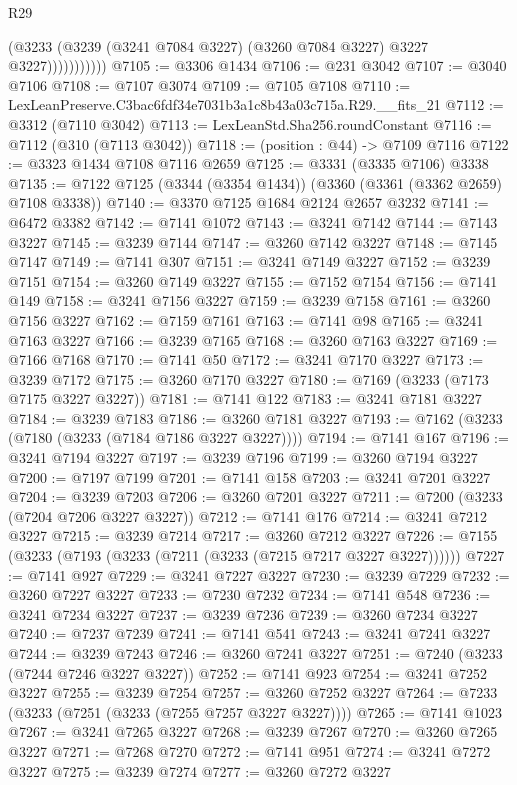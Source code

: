 \begin{lexlean}{R29}
\begin{coremodule}
                      (@3233 (@3239 (@3241 @7084 @3227) (@3260 @7084 @3227) @3227 @3227)))))))))))
@7105 := @3306 @1434
@7106 := @231 @3042
@7107 := @3040 @7106
@7108 := @7107 @3074
@7109 := @7105 @7108
@7110 := LexLeanPreserve.C3bac6fdf34e7031b3a1c8b43a03c715a.R29.__fits_21
@7112 := @3312 (@7110 @3042)
@7113 := LexLeanStd.Sha256.roundConstant
@7116 := @7112 (@310 (@7113 @3042))
@7118 := (position : @44) -> @7109 @7116
@7122 := @3323 @1434 @7108 @7116 @2659
@7125 := @3331 (@3335 @7106) @3338
@7135 := @7122 @7125 (@3344 (@3354 @1434)) (@3360 (@3361 (@3362 @2659) @7108 @3338))
@7140 := @3370 @7125 @1684 @2124 @2657 @3232
@7141 := @6472 @3382
@7142 := @7141 @1072
@7143 := @3241 @7142
@7144 := @7143 @3227
@7145 := @3239 @7144
@7147 := @3260 @7142 @3227
@7148 := @7145 @7147
@7149 := @7141 @307
@7151 := @3241 @7149 @3227
@7152 := @3239 @7151
@7154 := @3260 @7149 @3227
@7155 := @7152 @7154
@7156 := @7141 @149
@7158 := @3241 @7156 @3227
@7159 := @3239 @7158
@7161 := @3260 @7156 @3227
@7162 := @7159 @7161
@7163 := @7141 @98
@7165 := @3241 @7163 @3227
@7166 := @3239 @7165
@7168 := @3260 @7163 @3227
@7169 := @7166 @7168
@7170 := @7141 @50
@7172 := @3241 @7170 @3227
@7173 := @3239 @7172
@7175 := @3260 @7170 @3227
@7180 := @7169 (@3233 (@7173 @7175 @3227 @3227))
@7181 := @7141 @122
@7183 := @3241 @7181 @3227
@7184 := @3239 @7183
@7186 := @3260 @7181 @3227
@7193 := @7162 (@3233 (@7180 (@3233 (@7184 @7186 @3227 @3227))))
@7194 := @7141 @167
@7196 := @3241 @7194 @3227
@7197 := @3239 @7196
@7199 := @3260 @7194 @3227
@7200 := @7197 @7199
@7201 := @7141 @158
@7203 := @3241 @7201 @3227
@7204 := @3239 @7203
@7206 := @3260 @7201 @3227
@7211 := @7200 (@3233 (@7204 @7206 @3227 @3227))
@7212 := @7141 @176
@7214 := @3241 @7212 @3227
@7215 := @3239 @7214
@7217 := @3260 @7212 @3227
@7226 := @7155 (@3233 (@7193 (@3233 (@7211 (@3233 (@7215 @7217 @3227 @3227))))))
@7227 := @7141 @927
@7229 := @3241 @7227 @3227
@7230 := @3239 @7229
@7232 := @3260 @7227 @3227
@7233 := @7230 @7232
@7234 := @7141 @548
@7236 := @3241 @7234 @3227
@7237 := @3239 @7236
@7239 := @3260 @7234 @3227
@7240 := @7237 @7239
@7241 := @7141 @541
@7243 := @3241 @7241 @3227
@7244 := @3239 @7243
@7246 := @3260 @7241 @3227
@7251 := @7240 (@3233 (@7244 @7246 @3227 @3227))
@7252 := @7141 @923
@7254 := @3241 @7252 @3227
@7255 := @3239 @7254
@7257 := @3260 @7252 @3227
@7264 := @7233 (@3233 (@7251 (@3233 (@7255 @7257 @3227 @3227))))
@7265 := @7141 @1023
@7267 := @3241 @7265 @3227
@7268 := @3239 @7267
@7270 := @3260 @7265 @3227
@7271 := @7268 @7270
@7272 := @7141 @951
@7274 := @3241 @7272 @3227
@7275 := @3239 @7274
@7277 := @3260 @7272 @3227

\end{coremodule}
\end{lexlean}
